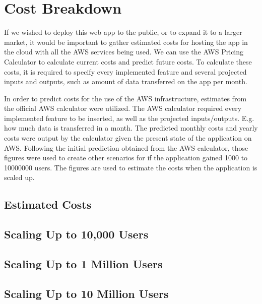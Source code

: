 \chapter{Cost Breakdown}\label{ch:cost-breakdown}

If we wished to deploy this web app to the public, or to expand it to a larger market, it would be important to
gather estimated costs for hosting the app in the cloud with all the AWS services being used.
We can use the AWS Pricing Calculator to calculate current costs and predict future costs.
To calculate these costs, it is required to specify every implemented feature and several projected inputs and outputs,
such as amount of data transferred on the app per month.


In order to predict costs for the use of the AWS infrastructure, estimates from the official AWS
calculator were utilized. The AWS calculator required every implemented feature to be
inserted, as well as the projected inputs/outputs. E.g. how much data is transferred in a month.
The predicted monthly costs and yearly costs were output by the calculator given the present
state of the application on AWS. Following the initial prediction obtained from the AWS
calculator, those figures were used to create other scenarios for if the application gained 1000
to 10000000 users. The figures are used to estimate the costs when the application is scaled
up.


\section{Estimated Costs}\label{sec:estimated-costs}


\section{Scaling Up to 10,000 Users}\label{sec:scaling-up-to-10000-users}


\section{Scaling Up to 1 Million Users}\label{sec:scaling-up-to-1-million-users}


\section{Scaling Up to 10 Million Users}\label{sec:scaling-up-to-10-million-users}
